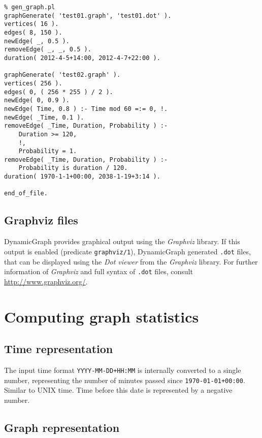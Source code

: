 \documentclass[11pt, a4paper,draft]{article}
\newcommand{\pl}[1]{\texttt{#1}} %
\theoremstyle{plain}
\theoremstyle{definition}
\theoremstyle{remark}
\newcommand{\gv}{\textit{Graphviz}}
\begin{document}
\begin{verbatim}
% gen_graph.pl
graphGenerate( 'test01.graph', 'test01.dot' ).
vertices( 16 ).
edges( 8, 150 ).
newEdge( _, 0.5 ).
removeEdge( _, _, 0.5 ).
duration( 2012-4-5+14:00, 2012-4-7+22:00 ).

graphGenerate( 'test02.graph' ).
vertices( 256 ).
edges( 0, ( 256 * 255 ) / 2 ).
newEdge( 0, 0.9 ).
newEdge( Time, 0.8 ) :- Time mod 60 =:= 0, !.
newEdge( _Time, 0.1 ).
removeEdge( _Time, Duration, Probability ) :-
    Duration >= 120,
    !,
    Probability = 1.
removeEdge( _Time, Duration, Probability ) :-
    Probability is duration / 120.
duration( 1970-1-1+00:00, 2038-1-19+3:14 ).

end_of_file.
\end{verbatim}

\subsection{Graphviz files}
\label{sec:files-graphviz}

DynamicGraph provides graphical output using the \gv{} library. 
If this output is enabled (predicate \pl{graphviz/1}), DynamicGraph generated \pl{.dot} files, 
that can be displayed using the \textit{Dot viewer} from the \gv{} library. 
For further information of \gv{} and full syntax of \pl{.dot} files, consult \url{http://www.graphviz.org/}.

\section{Computing graph statistics}
\label{sec:computing}



\subsection{Time representation}
\label{sec:computing-time}

The input time format \pl{YYYY-MM-DD+HH:MM} is internally converted to a single number,
representing the number of minutes passed since \pl{1970-01-01+00:00}. 
Similar to UNIX time. Time before this date is represented by a negative number.
 

\subsection{Graph representation}
\label{sec:computing-graph} 
\end{document}
